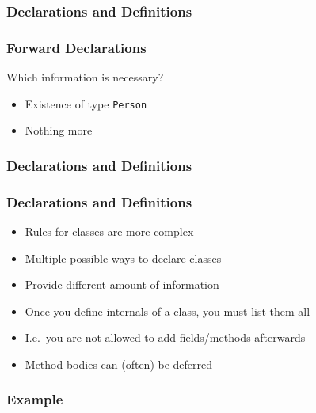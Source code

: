 \documentclass{../ucll-slides}
\begin{document}
\begin{frame}
  \frametitle{Declarations and Definitions}
\end{frame}

\begin{frame}
  \frametitle{Forward Declarations}
  Which information is necessary?
  \begin{itemize}
    \item Existence of type {\tt Person}
    \item Nothing more
  \end{itemize}
\end{frame}

\begin{frame}
  \frametitle{Declarations and Definitions}
\end{frame}

\begin{frame}
  \frametitle{Declarations and Definitions}
  \begin{itemize}
    \item Rules for classes are more complex
    \item Multiple possible ways to declare classes
    \item Provide different amount of information
    \item Once you define internals of a class, you must list them all
    \item I.e.\ you are not allowed to add fields/methods afterwards
    \item Method bodies can (often) be deferred
  \end{itemize}
\end{frame}

\begin{frame}
  \frametitle{Example}
  \begin{overprint}
  \end{overprint}
\end{frame}
\end{document}
